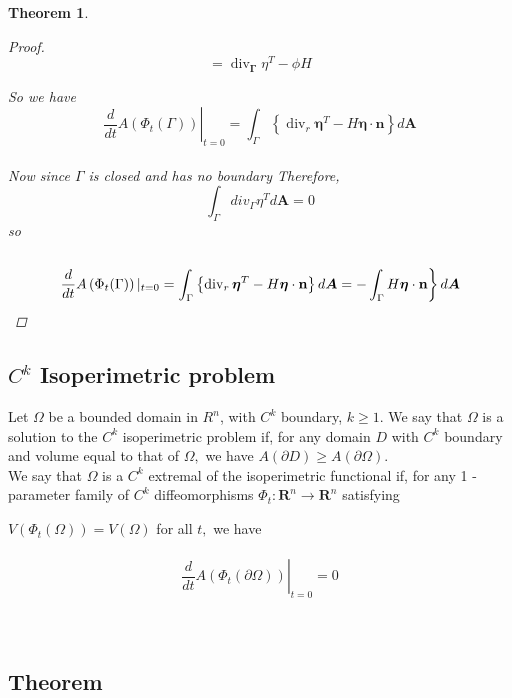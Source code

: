 \documentclass[oneside]{book}
\newtheorem{theorem}{Theorem}[section]
\begin{document}
\begin{theorem}
\begin{proof}
$$
{=\operatorname{div}_{\mathbf{\Gamma}} {\eta}^{T}-{\phi}{H}}
$$

So we have \\
$$
\left.\frac{d}{d t} A\left(\Phi_{t}(\Gamma)\right)\right|_{t=0}=\int_{\Gamma}\left\{\operatorname{div}_{r} \boldsymbol{\eta}^{T}-H \boldsymbol{\eta} \cdot \mathbf{n}\right\} d \boldsymbol{A}
 $$ \\




Now since $\Gamma$ is closed and has no boundary Therefore, $$\int_{\Gamma}div_{\Gamma}\eta^{T}d\textbf{A} = 0$$
so \\\\
\begin{equation}
    \left.\frac{d}{d t} A\left(\Phi_{t}(\Gamma)\right)|_{t=0}=\int_{\Gamma}\left\{\operatorname{div}_{r} \boldsymbol{\eta}^{T}-H \boldsymbol{\eta} \cdot \mathbf{n}\right\} d \boldsymbol{A}= -\int_{\Gamma}H \boldsymbol{\eta} \cdot \mathbf{n}\right\} d \boldsymbol{A}   \\\\
    \end{equation}
\end{proof}
\end{theorem}
 \subsection{$C^{k}$ Isoperimetric problem}
    Let $\Omega$ be a bounded domain in $R^{n}$, with $C^{k}$ boundary, $k \geq 1 .$ We
say that $\Omega$ is a solution to the $C^{k}$ isoperimetric problem if, for any domain $D$
with $C^{k}$ boundary and volume equal to that of $\Omega,$ we have $A(\partial D) \geq A(\partial \Omega) .$
\\




We say that $\Omega$ is a
$C^{k}$ extremal of the isoperimetric functional if, for any 1 -parameter family of
$C^{k}$ diffeomorphisms $\Phi_{t}: \mathbf{R}^{n} \rightarrow \mathbf{R}^{n}$ satisfying \par $V\left(\Phi_{t}(\Omega)\right)=V(\Omega)$ for all $t,$ we
have \\\\
\begin{equation}
\left.\frac{d}{d t} A\left(\Phi_{t}(\partial \Omega)\right)\right|_{t=0}=0
\end{equation}
\\\\
\subsection{Theorem}
\end{document}
